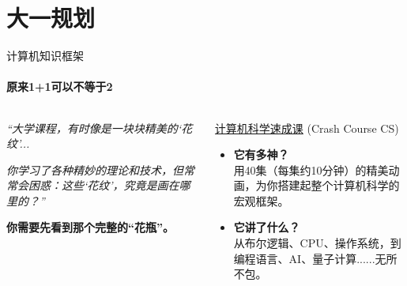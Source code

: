 \documentclass{beamer}
\newcommand{\hrefcol}[2]{\textcolor{cyan}{\href{#1}{#2}}}
\begin{document}
\section{大一规划}
\begin{frame}{计算机知识框架}
    \framesubtitle{原来1+1可以不等于2}
    \begin{columns}[T]
        \begin{column}{0.5\textwidth}
            \vspace{0.3cm}
            
            \textit{“大学课程，有时像是一块块精美的‘花纹’...}
            
            \textit{你学习了各种精妙的理论和技术，但常常会困惑：这些‘花纹’，究竟是画在哪里的？”}
            
            \vspace{0.5cm}
            \Large
            \textbf{你需要先看到那个完整的“花瓶”。}

        \end{column}
        
        \begin{column}{0.5\textwidth}
            \begin{center}
                \huge \hrefcol{https://www.bilibili.com/video/BV1EW411u7th/}{计算机科学速成课}
                \large (Crash Course CS)
            \end{center}
            
            \begin{itemize}
                \item \textbf{它有多神？} \\
                用40集（每集约10分钟）的精美动画，为你搭建起整个计算机科学的宏观框架。
                
                \item  \textbf{它讲了什么？} \\
                从布尔逻辑、CPU、操作系统，到编程语言、AI、量子计算......无所不包。
            \end{itemize}
        \end{column}
    \end{columns}


\end{frame}
\end{document}
